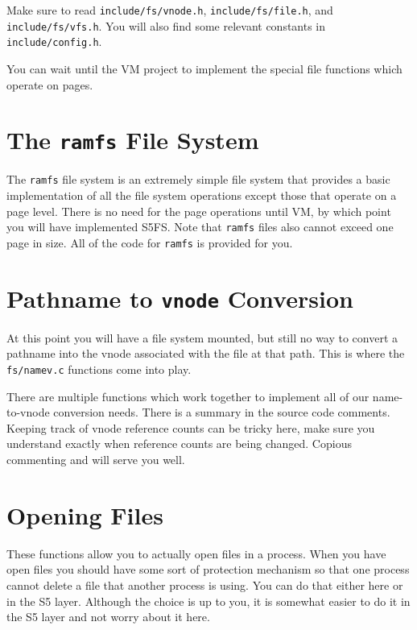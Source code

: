 Make sure to read \texttt{include/fs/vnode.h}, \texttt{include/fs/file.h}, and \texttt{include/fs/vfs.h}. You will also find some relevant constants in \texttt{include/config.h}.

You can wait until the VM project to implement the special file functions which operate on pages.


\section{The \texttt{ramfs} File System}

The \texttt{ramfs} file system is an extremely simple file system that provides a basic implementation of all the file system operations except those that operate on a page level. There is no need for the page operations until VM, by which point you will have implemented S5FS. Note that \texttt{ramfs} files also cannot exceed one page in size. All of the code for \texttt{ramfs} is provided for you.

\section{Pathname to \texttt{vnode} Conversion}

At this point you will have a file system mounted, but still no way to convert a pathname into the vnode associated with the file at that path. This is where the \texttt{fs/namev.c} functions come into play.

There are multiple functions which work together to implement all of our name-to-vnode conversion needs. There is a summary in the source code comments. Keeping track of vnode reference counts can be tricky here, make sure you understand exactly when reference counts are being changed. Copious commenting and  will serve you well.

\section{Opening Files}

These functions allow you to actually open files in a process. When you have open files you should have some sort of protection mechanism so that one process cannot delete a file that another process is using. You can do that either here or in the S5 layer. Although the choice is up to you, it is somewhat easier to do it in the S5 layer and not worry about it here.


